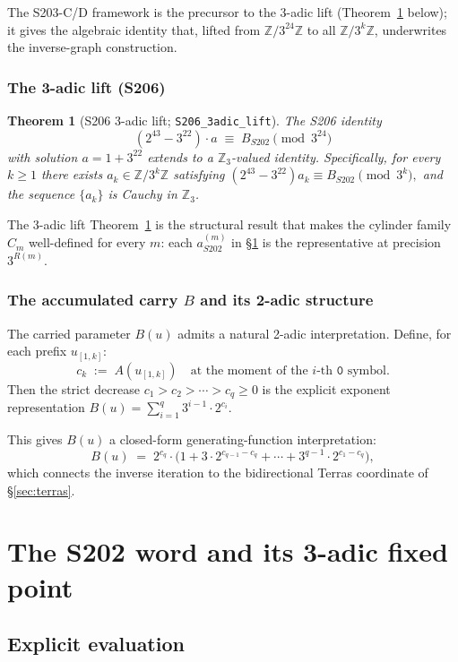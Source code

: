 \documentclass[11pt,a4paper]{article}
\theoremstyle{plain}
\newtheorem{theorem}{Theorem}[section]
\theoremstyle{definition}
\newcommand{\ZZ}{\mathbb{Z}}
\newcommand{\Zp}[1]{\mathbb{Z}_{#1}}
\newcommand{\aSat}{a_{S202}^{(m)}}
\begin{document}
The S203-C/D framework is the precursor to the 3-adic lift
(Theorem~\ref{thm:s206-lift} below); it gives the algebraic
identity that, lifted from $\ZZ/3^{24}\ZZ$ to all $\ZZ/3^k\ZZ$,
underwrites the inverse-graph construction.

\subsubsection*{The 3-adic lift (S206)}

\begin{theorem}[S206 3-adic lift; \texttt{S206\_3adic\_lift}]
\label{thm:s206-lift}
The S206 identity
\[
  (2^{43} - 3^{22}) \cdot a \;\equiv\; B_{S202} \pmod{3^{24}}
\]
with solution $a = 1 + 3^{22}$ extends to a $\Zp{3}$-valued
identity. Specifically, for every $k \ge 1$ there exists
$a_k \in \ZZ/3^k\ZZ$ satisfying
\(
   (2^{43} - 3^{22}) a_k \equiv B_{S202} \pmod{3^k},
\)
and the sequence $\{a_k\}$ is Cauchy in $\Zp{3}$.
\end{theorem}

The 3-adic lift Theorem~\ref{thm:s206-lift} is the structural
result that makes the cylinder family $C_m$ well-defined for
every $m$: each $\aSat$ in \S\ref{sec:s202-word} is the
representative at precision $3^{R(m)}$.

\subsubsection*{The accumulated carry $B$ and its 2-adic structure}

The carried parameter $B(u)$ admits a natural 2-adic
interpretation. Define, for each prefix $u_{[1, k]}$:
\[
   c_k \;:=\; A(u_{[1, k]}) \quad \text{at the moment of the $i$-th $\mathtt{0}$ symbol}.
\]
Then the strict decrease $c_1 > c_2 > \cdots > c_q \ge 0$ is the
explicit exponent representation
$B(u) = \sum_{i=1}^q 3^{i-1} \cdot 2^{c_i}$.

This gives $B(u)$ a closed-form generating-function
interpretation:
\[
   B(u) \;=\; 2^{c_q} \cdot \bigl(1 + 3 \cdot 2^{c_{q-1} - c_q} + \cdots + 3^{q-1} \cdot 2^{c_1 - c_q}\bigr),
\]
which connects the inverse iteration to the bidirectional Terras
coordinate of \S\ref{sec:terras}.

\section{The S202 word and its 3-adic fixed point}\label{sec:s202-word}

\subsection{Explicit evaluation}
\end{document}
